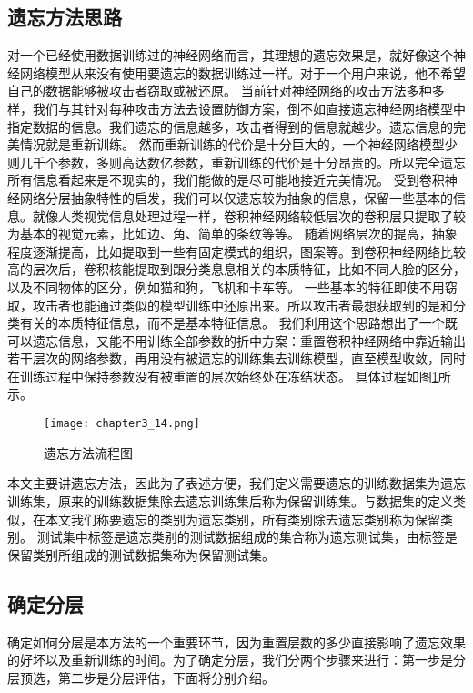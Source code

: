 \subsection{遗忘方法思路}
对一个已经使用数据训练过的神经网络而言，其理想的遗忘效果是，就好像这个神经网络模型从来没有使用要遗忘的数据训练过一样。对于一个用户来说，他不希望自己的数据能够被攻击者窃取或被还原。
当前针对神经网络的攻击方法多种多样，我们与其针对每种攻击方法去设置防御方案，倒不如直接遗忘神经网络模型中指定数据的信息。我们遗忘的信息越多，攻击者得到的信息就越少。遗忘信息的完美情况就是重新训练。
然而重新训练的代价是十分巨大的，一个神经网络模型少则几千个参数，多则高达数亿参数，重新训练的代价是十分昂贵的。所以完全遗忘所有信息看起来是不现实的，我们能做的是尽可能地接近完美情况。
受到卷积神经网络分层抽象特性的启发，我们可以仅遗忘较为抽象的信息，保留一些基本的信息。就像人类视觉信息处理过程一样，卷积神经网络较低层次的卷积层只提取了较为基本的视觉元素，比如边、角、简单的条纹等等。
随着网络层次的提高，抽象程度逐渐提高，比如提取到一些有固定模式的组织，图案等。到卷积神经网络比较高的层次后，卷积核能提取到跟分类息息相关的本质特征，比如不同人脸的区分，以及不同物体的区分，例如猫和狗，飞机和卡车等。
一些基本的特征即使不用窃取，攻击者也能通过类似的模型训练中还原出来。所以攻击者最想获取到的是和分类有关的本质特征信息，而不是基本特征信息。
我们利用这个思路想出了一个既可以遗忘信息，又能不用训练全部参数的折中方案：重置卷积神经网络中靠近输出若干层次的网络参数，再用没有被遗忘的训练集去训练模型，直至模型收敛，同时在训练过程中保持参数没有被重置的层次始终处在冻结状态。
具体过程如图\ref{fig:chapter3_14}所示。
\begin{figure}
    \centering
    \texttt{[image: chapter3\_14.png]}
    \caption{遗忘方法流程图}
    \label{fig:chapter3_14}
\end{figure}

本文主要讲遗忘方法，因此为了表述方便，我们定义需要遗忘的训练数据集为遗忘训练集，原来的训练数据集除去遗忘训练集后称为保留训练集。与数据集的定义类似，在本文我们称要遗忘的类别为遗忘类别，所有类别除去遗忘类别称为保留类别。
测试集中标签是遗忘类别的测试数据组成的集合称为遗忘测试集，由标签是保留类别所组成的测试数据集称为保留测试集。

\subsection{确定分层}
确定如何分层是本方法的一个重要环节，因为重置层数的多少直接影响了遗忘效果的好坏以及重新训练的时间。为了确定分层，我们分两个步骤来进行：第一步是分层预选，第二步是分层评估，下面将分别介绍。

